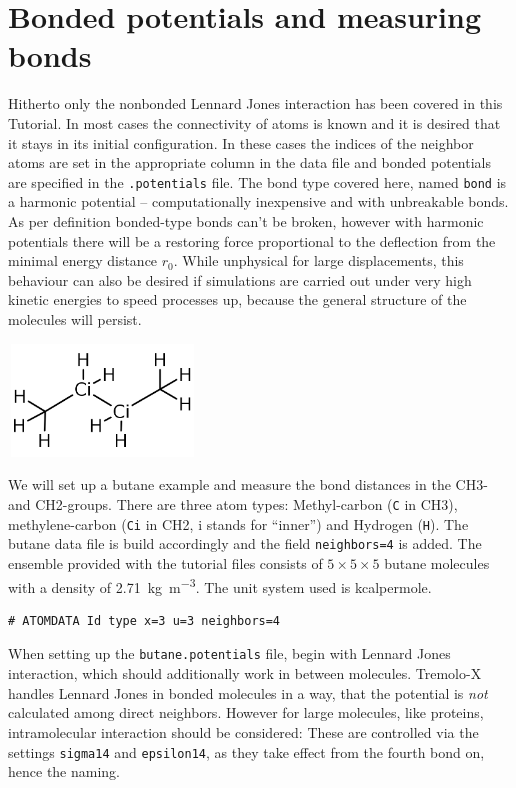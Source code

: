 \section{Bonded potentials and measuring bonds}
Hitherto only the nonbonded Lennard Jones interaction has been covered in
this Tutorial. In most cases the connectivity of atoms is known and it
is desired that it stays in its initial configuration. In these cases
the indices of the neighbor atoms are set in the appropriate column in
the data file and bonded potentials are specified in the
\texttt{.potentials} file. The bond type covered here, named
\texttt{bond} is a harmonic potential -- computationally inexpensive and
with unbreakable bonds. As
per definition bonded-type bonds can't be broken, however with harmonic
potentials there will be a restoring force proportional to the
deflection from the minimal energy distance $r_0$. While unphysical for
large displacements, this behaviour can also be desired if simulations
are carried out under very high kinetic energies to speed processes up,
because the general structure of the molecules will persist.

\begin{center}
    \includegraphics[width=5cm, height=3cm]{visuals/butane} %
\end{center}

We will set up a butane example and measure the bond distances in the
CH3- and CH2-groups. There are three atom types: Methyl-carbon
(\texttt{C} in CH3), methylene-carbon (\texttt{Ci} in CH2, i stands for
``inner'') and Hydrogen (\texttt{H}). The butane data file is build
accordingly and the field \texttt{neighbors=4} is added. The ensemble
provided with the tutorial files consists of $5\times 5\times 5$ butane
molecules with a density of \SI{2.71}{\kilogram\per\cubic\meter}. The
unit system used is kcalpermole.

\begin{lstlisting}[caption=Header of the .data file]
# ATOMDATA Id type x=3 u=3 neighbors=4
\end{lstlisting}

When setting up the \texttt{butane.potentials} file, begin with Lennard
Jones interaction, which should additionally work in between molecules.
Tremolo-X handles Lennard Jones in bonded molecules in a way, that the
potential is \emph{not} calculated among direct neighbors. However for
large molecules, like proteins, intramolecular interaction should be
considered: These are controlled via the settings \texttt{sigma14} and
\texttt{epsilon14}, as they take effect from the fourth bond on, hence
the naming.

